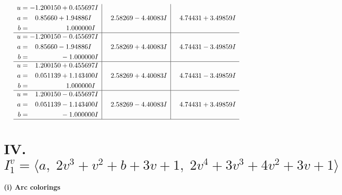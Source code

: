 \documentclass[1p]{elsarticle_modified}
\theoremstyle{definition}
\begin{document}
$$\begin{array}{c|c|c}
\begin{aligned}
u &= -1.200150 + 0.455697 I \\
a &= \phantom{-}0.85660 + 1.94886 I \\
b &= \phantom{-0.000000 -}1.000000 I\end{aligned}
 & \phantom{-}2.58269 - 4.40083 I & \phantom{-}4.74431 + 3.49859 I \\ \hline\begin{aligned}
u &= -1.200150 - 0.455697 I \\
a &= \phantom{-}0.85660 - 1.94886 I \\
b &= \phantom{-0.000000 } -1.000000 I\end{aligned}
 & \phantom{-}2.58269 + 4.40083 I & \phantom{-}4.74431 - 3.49859 I \\ \hline\begin{aligned}
u &= \phantom{-}1.200150 + 0.455697 I \\
a &= \phantom{-}0.051139 + 1.143400 I \\
b &= \phantom{-0.000000 -}1.000000 I\end{aligned}
 & \phantom{-}2.58269 + 4.40083 I & \phantom{-}4.74431 - 3.49859 I \\ \hline\begin{aligned}
u &= \phantom{-}1.200150 - 0.455697 I \\
a &= \phantom{-}0.051139 - 1.143400 I \\
b &= \phantom{-0.000000 } -1.000000 I\end{aligned}
 & \phantom{-}2.58269 - 4.40083 I & \phantom{-}4.74431 + 3.49859 I\\
 \hline 
 \end{array}$$\newpage\newpage\renewcommand{\arraystretch}{1}
\centering \section*{IV. $I^v_{1}= \langle a,\;2 v^3+v^2+b+3 v+1,\;2 v^4+3 v^3+4 v^2+3 v+1 \rangle$}
\flushleft \textbf{(i) Arc colorings}\\
\end{document}
